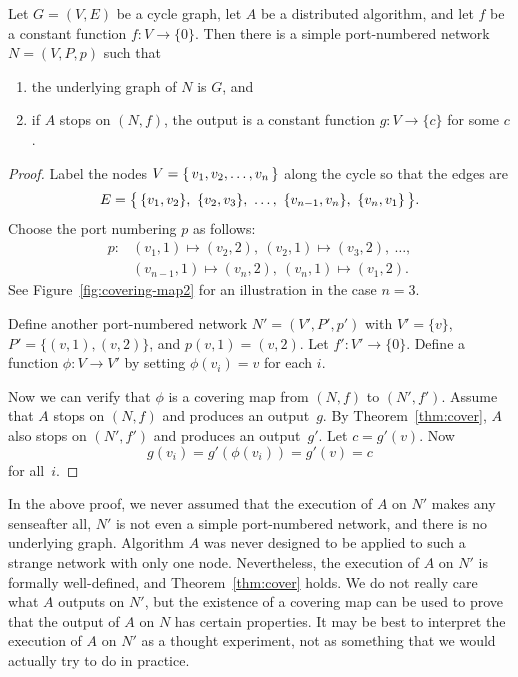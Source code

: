 \begin{lemma}\label{lem:cycle-symmetric}
    Let $G = (V,E)$ be a cycle graph, let $A$ be a distributed algorithm, and let $f$ be a constant function $f\colon V \to \{0\}$. Then there is a simple port-numbered network $N = (V,P,p)$ such that
    \begin{enumerate}
        \item the underlying graph of $N$ is $G$, and
        \item if $A$ stops on $(N,f)$, the output is a constant function $g\colon V \to \{c\}$ for some $c$.
    \end{enumerate}
\end{lemma}
\begin{proof}
    Label the nodes $V = \{\,  v_1, v_2, \dotsc, v_n  \,\}$ along the cycle so that the edges are
    \[
        E = \bigSet{ \{v_1, v_2\},\ \{v_2, v_3\},\ \dotsc,\ \{v_{n-1}, v_n\},\ \{v_n, v_1\} }.
    \]
    Choose the port numbering $p$ as follows:
    \begin{align*}
        p\colon &(v_1, 1) \mapsto (v_2, 2),\ (v_2, 1) \mapsto (v_3, 2),\ \dotsc, \\
                &(v_{n-1}, 1) \mapsto (v_n, 2),\ (v_n, 1) \mapsto (v_1, 2).
    \end{align*}
    See Figure~\ref{fig:covering-map2} for an illustration in the case $n = 3$.
    
    Define another port-numbered network $N' = (V'\!,P'\!,p')$ with $V' = \{v\}$, $P' = \{ (v,1), (v,2) \}$, and $p(v,1) = (v,2)$. Let $f'\colon V' \to \{0\}$. Define a function $\phi\colon V \to V'$ by setting $\phi(v_i) = v$ for each $i$.
    
    Now we can verify that $\phi$ is a covering map from $(N,f)$ to $(N'\!,f')$. Assume that $A$ stops on $(N,f)$ and produces an output~$g$. By Theorem~\ref{thm:cover}, $A$ also stops on $(N'\!,f')$ and produces an output~$g'$. Let $c = g'(v)$. Now
    \[
        g(v_i) = g'(\phi(v_i)) = g'(v) = c
    \]
    for all~$i$.
\end{proof}

In the above proof, we never assumed that the execution of $A$ on $N'$ makes any sense\mydash after all, $N'$ is not even a simple port-numbered network, and there is no underlying graph. Algorithm $A$ was never designed to be applied to such a strange network with only one node. Nevertheless, the execution of $A$ on $N'$ is formally well-defined, and Theorem~\ref{thm:cover} holds. We do not really care what $A$ outputs on $N'$, but the existence of a covering map can be used to prove that the output of $A$ on $N$ has certain properties. It may be best to interpret the execution of $A$ on $N'$ as a thought experiment, not as something that we would actually try to do in practice.

